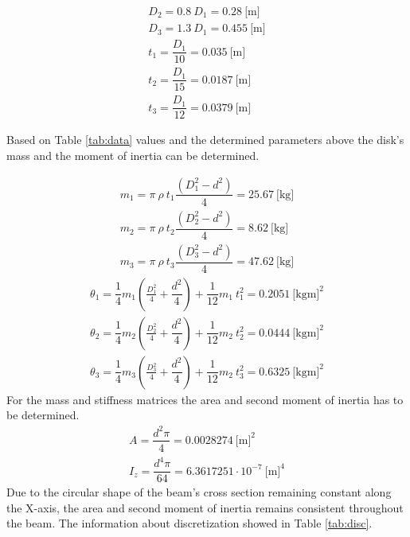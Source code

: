 \documentclass[12pt]{article}
\begin{document}
\begin{gather}
D_2 = 0.8~ D_1 = 0.28 ~ \text{[m]}\\[0.1cm]
D_3 = 1.3~ D_1 = 0.455 ~ \text{[m]} \\[0.1cm]
t_1 = \dfrac{D_1}{10} = 0.035 ~ \text{[m]}\\[0.1cm]
t_2 = \dfrac{D_1}{15}  = 0.0187 ~ \text{[m]}\\[0.1cm]
t_3 = \dfrac{D_1}{12} = 0.0379 ~ \text{[m]}
\end{gather}

\noindent Based on Table \ref{tab:data} values and the determined parameters above the disk's mass and the moment of inertia can be determined.

\begin{gather}
m_1 = \pi ~ \rho ~ t_{1} \dfrac{\left(D_{1}^{2} - d^{2}\right)}{4} = 25.67 ~ \text{[kg]}\\[0.1cm]
m_2 = \pi ~ \rho ~ t_{2} \dfrac{\left(D_{2}^{2} - d^{2}\right)}{4} = 8.62 ~ \text{[kg]}\\[0.1cm]
m_3 = \pi ~ \rho ~ t_{3} \dfrac{\left(D_{3}^{2} - d^{2}\right)}{4} = 47.62 ~ \text{[kg]}
\end{gather}
\begin{gather}
\theta_1 = \dfrac{1}{4} m_1 \left( \frac{D_1^2}{4} + \dfrac{d^2}{4} \right) + \dfrac{1}{12} m_1 ~ t_1^2 = 0.2051 ~ \text{[kgm]}^2\\[0.1cm]
\theta_2 = \dfrac{1}{4} m_2 \left( \frac{D_2^2}{4} + \dfrac{d^2}{4} \right) + \dfrac{1}{12} m_2 ~ t_2^2 = 0.0444 ~ \text{[kgm]}^2\\[0.1cm]
\theta_3 = \dfrac{1}{4} m_3 \left( \frac{D_3^2}{4} + \dfrac{d^2}{4} \right) + \dfrac{1}{12} m_2 ~ t_3^2 = 0.6325 ~ \text{[kgm]}^2
\end{gather}
For the mass and stiffness matrices the area and second moment of inertia has to be determined.
\begin{gather}
A = \dfrac{d ^2  \pi}{4} = 0.0028274 ~ \text{[m]}^2 \\
I_z = \dfrac{d^4  \pi}{64} = 6.3617251 \cdot 10^{-7} ~ \text{[m]}^4
\end{gather} 
Due to the circular shape of the beam's cross section remaining constant along the X-axis, the area and second moment of inertia remains consistent throughout the beam. The
information about discretization showed in Table \ref{tab:disc}.
\end{document}
